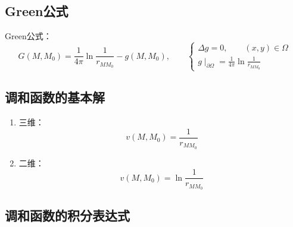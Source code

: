 \documentclass[lang = cn, scheme = chinese, thmcnt = section]{elegantbook}
\begin{document}
\subsection{Green公式}

\begin{note}
	Green公式：
	$$
	G(M,M_0)=\frac{1}{4\pi}\ln\frac{1}{r_{MM_0}}-g(M,M_0),\qquad
	\begin{cases}
		\Delta g=0,\qquad (x,y)\in\Omega\\
		g\mid_{\partial\Omega}=\frac{1}{4\pi}\ln\frac{1}{r_{MM_0}}
	\end{cases}
	$$
\end{note}

\subsection{调和函数的基本解}

\begin{note}
	\begin{enumerate}
		\item 三维：%
		$$
		v(M,M_0)=\frac{1}{r_{MM_0}}
		$$
		\item 二维：
		$$
		v(M,M_0)=\ln\frac{1}{r_{MM_0}}
		$$
	\end{enumerate}
\end{note}

\subsection{调和函数的积分表达式}
\end{document}
